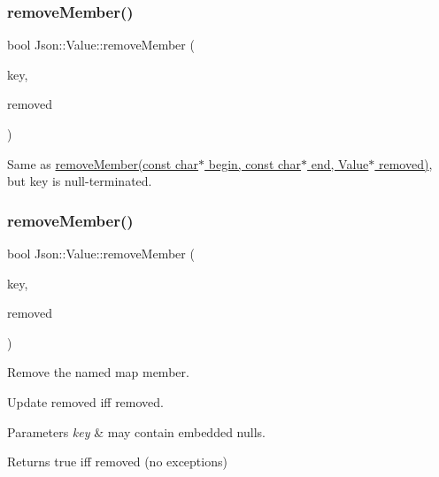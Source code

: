 \subsubsection{\texorpdfstring{remove\+Member()}{removeMember()}\hspace{0.1cm}{\footnotesize\ttfamily [3/4]}}
{\footnotesize\ttfamily bool Json\+::\+Value\+::remove\+Member (\begin{DoxyParamCaption}\item[{const char $\ast$}]{key,  }\item[{\hyperlink{classJson_1_1Value}{Value} $\ast$}]{removed }\end{DoxyParamCaption})}

Same as \hyperlink{classJson_1_1Value_a49c91af727d6b4eb0af02a81bb2def87}{remove\+Member(const char$\ast$ begin, const char$\ast$ end, Value$\ast$ removed)}, but \textquotesingle{}key\textquotesingle{} is null-\/terminated. \mbox{\label{classJson_1_1Value_ae385ecef98427970df525ee876e9f54a}} 
\subsubsection{\texorpdfstring{remove\+Member()}{removeMember()}\hspace{0.1cm}{\footnotesize\ttfamily [4/4]}}
{\footnotesize\ttfamily bool Json\+::\+Value\+::remove\+Member (\begin{DoxyParamCaption}\item[{J\+S\+O\+N\+C\+P\+P\+\_\+\+S\+T\+R\+I\+NG const \&}]{key,  }\item[{\hyperlink{classJson_1_1Value}{Value} $\ast$}]{removed }\end{DoxyParamCaption})}



Remove the named map member. 

Update \textquotesingle{}removed\textquotesingle{} iff removed. 
\begin{DoxyParams}{Parameters}
{\em key} & may contain embedded nulls. \\
\hline
\end{DoxyParams}
\begin{DoxyReturn}{Returns}
true iff removed (no exceptions) 
\end{DoxyReturn}
\mbox{\label{classJson_1_1Value_a7a064d8aa47fde09a268be2aea992134}} 
